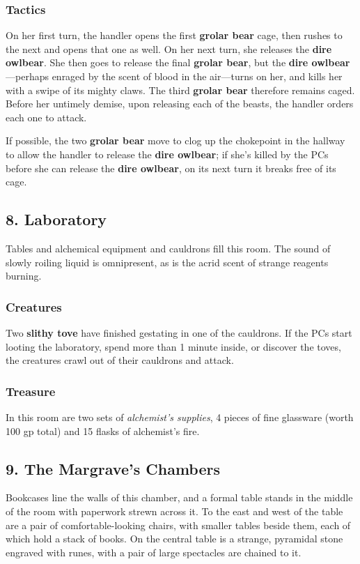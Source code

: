 \documentclass[10pt,a4paper,twoside,bg=print,twocolumn,openany,nodeprecatedcode]{dndbook}
\begin{document}
\subsubsection{Tactics}
On her first turn, the handler opens the first \textbf{grolar bear} cage, then rushes to the next and opens that one as well. On her next turn, she releases the \textbf{dire owlbear}. She then goes to release the final \textbf{grolar bear}, but the \textbf{dire owlbear}—perhaps enraged by the scent of blood in the air—turns on her, and kills her with a swipe of its mighty claws. The third \textbf{grolar bear} therefore remains caged. Before her untimely demise, upon releasing each of the beasts, the handler orders each one to attack.

If possible, the two \textbf{grolar bear} move to clog up the chokepoint in the hallway to allow the handler to release the \textbf{dire owlbear}; if she's killed by the PCs before she can release the \textbf{dire owlbear}, on its next turn it breaks free of its cage.

\subsection{8. Laboratory}
\begin{DndReadAloud}{}
Tables and alchemical equipment and cauldrons fill this room. The sound of slowly roiling liquid is omnipresent, as is the acrid scent of strange reagents burning.

\end{DndReadAloud}

\subsubsection{Creatures}
Two \textbf{slithy tove} have finished gestating in one of the cauldrons. If the PCs start looting the laboratory, spend more than 1 minute inside, or discover the toves, the creatures crawl out of their cauldrons and attack.

\subsubsection{Treasure}
In this room are two sets of \textit{alchemist's supplies}, 4 pieces of fine glassware (worth 100 gp total) and 15 flasks of alchemist's fire.

\subsection{9. The Margrave's Chambers}
\begin{DndReadAloud}{}
Bookcases line the walls of this chamber, and a formal table stands in the middle of the room with paperwork strewn across it. To the east and west of the table are a pair of comfortable-looking chairs, with smaller tables beside them, each of which hold a stack of books. On the central table is a strange, pyramidal stone engraved with runes, with a pair of large spectacles are chained to it.

\end{DndReadAloud}
\end{document}
